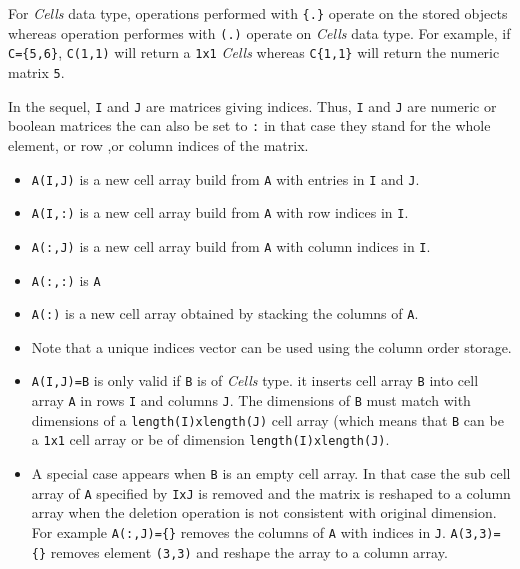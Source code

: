For \emph{Cells} data type, operations performed with \verb+{.}+ operate on the stored objects whereas 
operation performes with \verb+(.)+ operate on \emph{Cells} data type. For example, if \verb+C={5,6}+, 
\verb+C(1,1)+ will return a \verb+1x1+ \emph{Cells} whereas  \verb+C{1,1}+ will return the numeric matrix \verb+5+. 

In the sequel, \verb+I+ and \verb+J+ are matrices giving indices. Thus, \verb+I+ and \verb+J+ are 
numeric or boolean matrices the can also be set to \verb+:+ in that case they stand for the whole 
element, or row ,or column indices of the matrix. 

\begin{itemize}
\item \verb+A(I,J)+ is a new cell array build from \verb+A+ with entries in \verb+I+ and \verb+J+. 
\item \verb+A(I,:)+ is a new cell array build from \verb+A+ with row indices in \verb+I+.
\item \verb+A(:,J)+ is a new cell array build from \verb+A+ with column indices in \verb+I+.
\item \verb+A(:,:)+ is \verb+A+
\item \verb+A(:)+ is a new cell array obtained by stacking the columns of \verb+A+.
\item Note that a unique indices vector can be used using the column order storage.
\end{itemize}

\begin{itemize}
\item \verb+A(I,J)=B+ is only valid if \verb+B+ is of \emph{Cells} type. 
  it inserts cell array \verb+B+ into cell array \verb+A+ in rows \verb+I+ and columns \verb!J!.
  The dimensions of \verb!B! must match with dimensions of a \verb+length(I)xlength(J)+ cell array 
  (which means that \verb!B! can be a \verb!1x1! cell array or be of dimension \verb+length(I)xlength(J)+. 
\item A special case appears when \verb!B! is an empty cell array. In that case the sub cell array of 
  \verb!A! specified by \verb+IxJ+ is removed and the matrix is reshaped to a column array when the deletion 
  operation is not consistent with original dimension. For example \verb+A(:,J)={}+ removes the columns 
  of \verb+A+ with indices in \verb+J+. \verb!A(3,3)={}! removes element \verb!(3,3)! and reshape
  the array to a column array.
\end{itemize}

